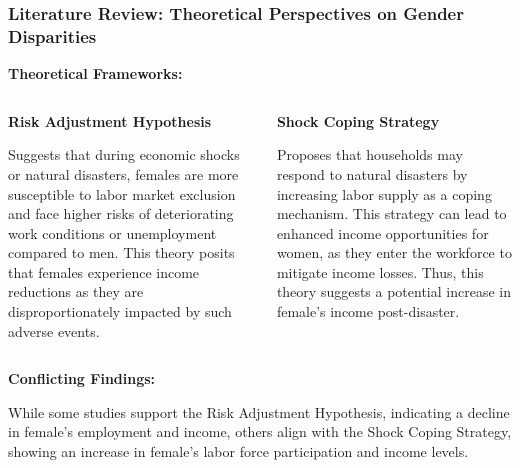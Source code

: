 \documentclass[serif, aspectratio=169]{beamer}
\newcommand{\returnbutton}[2]{%
  \vspace{-1.0cm}  %
  \hfill  %
  \hyperlink{#1}{%
    {\footnotesize\beamerbutton{#2}}%
  }%
  \vspace{0.3cm}  %
}
\begin{document}
\begin{frame}[label=theoretical_perspective]
\frametitle{Literature Review: Theoretical Perspectives on Gender Disparities}

\vspace{0.2cm}

\returnbutton{literature_review2}{Return}

    \textbf{Theoretical Frameworks:}
    
    \vspace{0.1cm}
    
    \begin{columns}[T] %
        \begin{column}{0.48\textwidth}
            \textbf{Risk Adjustment Hypothesis}
            
            \vspace{0.1cm}
            
            Suggests that during economic shocks or natural disasters, females are more susceptible to labor market exclusion and face higher risks of deteriorating work conditions or unemployment compared to men. This theory posits that females experience income reductions as they are disproportionately impacted by such adverse events.
        \end{column}
        \hfill
        \begin{column}{0.48\textwidth}
            \textbf{Shock Coping Strategy}
            
            \vspace{0.1cm}
            
            Proposes that households may respond to natural disasters by increasing labor supply as a coping mechanism. This strategy can lead to enhanced income opportunities for women, as they enter the workforce to mitigate income losses. Thus, this theory suggests a potential increase in female's income post-disaster.
        \end{column}
    \end{columns}
    
    \vspace{0.3cm}
    
    \textbf{Conflicting Findings:}
    
    While some studies support the Risk Adjustment Hypothesis, indicating a decline in female's employment and income, others align with the Shock Coping Strategy, showing an increase in female's labor force participation and income levels.

\end{frame}
\end{document}
